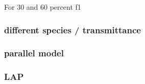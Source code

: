 For 30 and 60 percent f1 

% 
% 
% 
\subsubsection{different species / transmittance}
% 
% 
% 
\subsubsection{parallel model}
% 
% 
% 
\subsubsection{LAP}
